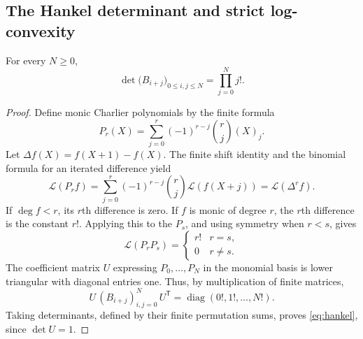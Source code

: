 \subsection{The Hankel determinant and strict log-convexity}

\begin{theorem}\label{thm:hankel}
For every $N\geq0$,
\begin{equation}\label{eq:hankel}
 \det\bigl(B_{i+j}\bigr)_{0\leq i,j\leq N}
       =\prod_{j=0}^{N}j!.
\end{equation}
\end{theorem}
\begin{proof}
Define monic Charlier polynomials by the finite formula
\[
 P_r(X)=\sum_{j=0}^{r}(-1)^{r-j}\binom rj(X)_j.
\]
Let $\Delta f(X)=f(X+1)-f(X)$. The finite shift identity and the binomial
formula for an iterated difference yield
\[
 \mathcal L(P_r f)
   =\sum_{j=0}^{r}(-1)^{r-j}\binom rj\mathcal L(f(X+j))
   =\mathcal L(\Delta^r f).
\]
If $\deg f<r$, its $r$th difference is zero. If $f$ is monic of degree $r$,
the $r$th difference is the constant $r!$. Applying this to the $P_s$, and
using symmetry when $r<s$, gives
\[
  \mathcal L(P_rP_s)=\begin{cases}r!&r=s,\\0&r\ne s.\end{cases}
\]
The coefficient matrix $U$ expressing $P_0,\ldots,P_N$ in the monomial basis
is lower triangular with diagonal entries one. Thus, by multiplication of
finite matrices,
\[
 U\,(B_{i+j})_{i,j=0}^{N}\,U^{\mathsf T}
       =\operatorname{diag}(0!,1!,\ldots,N!).
\]
Taking determinants, defined by their finite permutation sums, proves
\eqref{eq:hankel}, since $\det U=1$.
\end{proof}

